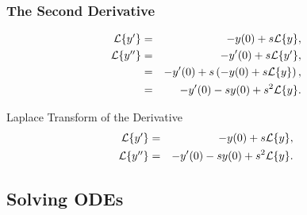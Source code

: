 \begin{frame}
  \frametitle{The Second Derivative}

  \begin{eqnarray*}
    \laplace{y'} & = & -y(0) + s \laplace{y}, \\
    \laplace{y''} & = & -y'(0) + s \laplace{y'}, \\
    & = & -y'(0) + s \lp -y(0) + s \laplace{y} \rp, \\
    & = & -y'(0) - s y(0) + s^2 \laplace{y}.
  \end{eqnarray*}

\end{frame}

\begin{frame}
  \begin{block}{Laplace Transform of the Derivative}
    \begin{eqnarray*}
      \laplace{y'} & = & -y(0) + s \laplace{y}, \\
      \laplace{y''} & = & -y'(0) - s y(0) + s^2 \laplace{y}.
    \end{eqnarray*}
  \end{block}
\end{frame}


\subsection{Solving ODEs}

